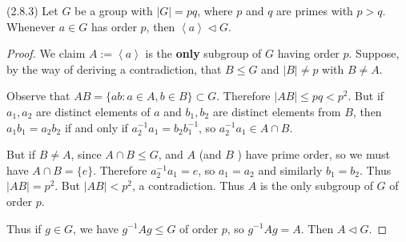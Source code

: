 \begin{lemma}
	(2.8.3)
	Let $G$ be a group with $|G| = p q$, where $p$ and $q$ are primes with $p > q$. Whenever $a \in G$ has order $p$, then $\left\langle a \right\rangle \triangleleft G$.
\end{lemma}
\begin{proof}
	We claim $A:=\left\langle a \right\rangle $ is the \textbf{only} subgroup of $G$ having order $p$. Suppose, by the way of deriving a contradiction, that $B \le G$ and $|B|\neq p$ with $B \neq A$.
	
	Observe that $AB = \{ab: a \in A, b \in B\} \subset G$. Therefore $|AB| \le pq<p^2$. But if $a_1, a_2$ are distinct elements of $a$ and $b_1, b_2$ are distinct elements from $B$, then $a_1b_1 = a_2b_2$ if and only if $a_2^{-1}a_1 = b_2b_1^{-1}$, so $a_2^{-1}a_1 \in A \cap B$. 

	But if $B \neq A$, since $A \cap B \le G$, and $A$ (and $B$ ) have prime order, so we must have $A \cap B = \{e\} $. Therefore $a_2^{-1}a_1 = e$, so $a_1 = a_2$ and similarly $b_1 = b_2$. Thus $|AB| = p^2$. But $|AB|<p^2$, a contradiction. Thus $A$ is the only subgroup of  $G$ of order $p$.

	Thus if $g \in G$, we have $g^{-1} Ag\le G$ of order $p$, so $g^{-1} Ag = A$. Then $A \triangleleft G$.
\end{proof}


